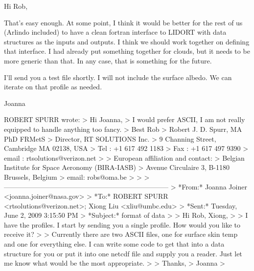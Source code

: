 Hi Rob,

That's easy enough. At some point, I think it would be better for the rest of us (Arlindo included) to have a clean fortran interface to LIDORT with data structures as the inputs and outputs. I think we should work together on defining that interface. I had already put something together for clouds, but it needs to be more generic than that. In any case, that is something for the future.

I'll send you a test file shortly. I will not include the surface albedo. We can iterate on that profile as needed.

Joanna

ROBERT SPURR wrote:
> Hi Joanna,
>  I would prefer ASCII, I am not really equipped to handle anything too fancy.
>  Best   Rob
>  Robert J. D. Spurr, MA PhD FRMetS
> Director, RT SOLUTIONS Inc.
> 9 Channing Street, Cambridge MA 02138, USA
> Tel : +1 617 492 1183
> Fax : +1 617 497 9390
> email : rtsolutions@verizon.net
>
> European affiliation and contact:
> Belgian Institute for Space Aeronomy (BIRA-IASB)
> Avenue Circulaire 3, B-1180 Brussels, Belgium
> email: robs@oma.be
>
>
> ------------------------------------------------------------------------
> *From:* Joanna Joiner <joanna.joiner@nasa.gov>
> *To:* ROBERT SPURR <rtsolutions@verizon.net>; Xiong Liu <xliu@umbc.edu>
> *Sent:* Tuesday, June 2, 2009 3:15:50 PM
> *Subject:* format of data
>
> Hi Rob, Xiong,
>
> I have the profiles. I start by sending you a single profile. How would you like to receive it?
>
> Currently there are two ASCII files, one for surface skin temp and one for everything else. I can write some code to get that into a data structure for you or put it into one netcdf file and supply you a reader. Just let me know what would be the most appropriate.
>
> Thanks,
> Joanna
>